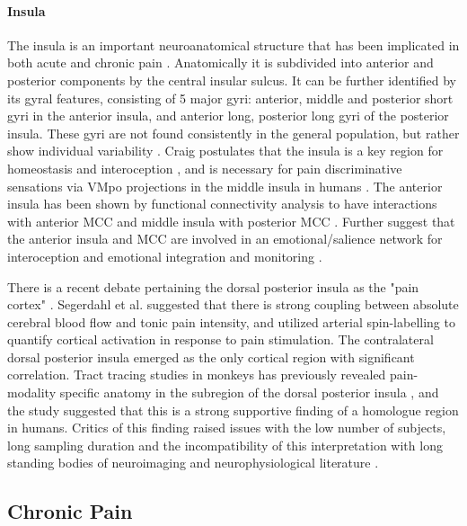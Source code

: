\paragraph{Insula}

The insula is an important neuroanatomical structure that has been implicated in both acute \cite{Lorenz2005,Starr2009} and chronic pain \cite{May2008,Jensen2016}. Anatomically it is subdivided into anterior and posterior components by the central insular sulcus. It can be further identified by its gyral features, consisting of 5 major gyri: anterior, middle and posterior short gyri in the anterior insula, and anterior long, posterior long gyri of the posterior insula. These gyri are not found consistently in the general population, but rather show individual variability \cite{Rosen2015}. Craig postulates that the insula is a key region for homeostasis and interoception \cite{Craig2003b}, and is necessary for pain discriminative sensations via VMpo projections in the middle insula in humans \cite{Craig2003a}. The anterior insula has been shown by functional connectivity analysis to have interactions with anterior MCC and middle insula with posterior MCC \cite{Taylor2009}. Further suggest that the anterior insula and MCC are involved in an emotional/salience network for interoception and emotional integration and monitoring \cite{Vogt2016}.  

There is a recent debate pertaining the dorsal posterior insula as the "pain cortex" \cite{Segerdahl2015a}. Segerdahl et al. suggested that there is strong coupling between absolute cerebral blood flow and tonic pain intensity, and utilized arterial spin-labelling to quantify cortical activation in response to pain stimulation. The contralateral dorsal posterior insula emerged as the only cortical region with significant correlation. Tract tracing studies in monkeys has previously revealed pain-modality specific anatomy in the subregion of the dorsal posterior insula \cite{Craig2014}, and the study suggested that this is a strong supportive finding of a homologue region in humans. Critics of this finding raised issues with the low number of subjects, long sampling duration and the incompatibility of this interpretation with long standing bodies of neuroimaging and neurophysiological literature \cite{Davis2015}. 

\subsection{Chronic Pain}

